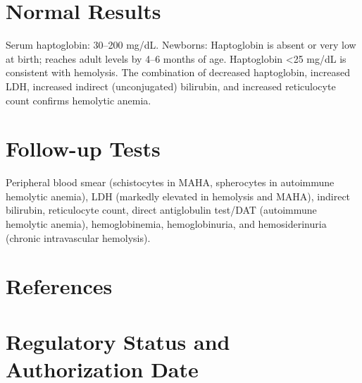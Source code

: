 \section*{Normal Results}
Serum haptoglobin: 30--200 mg/dL. Newborns: Haptoglobin is absent or very low at birth; reaches adult levels by 4--6 months of age. Haptoglobin <25 mg/dL is consistent with hemolysis. The combination of decreased haptoglobin, increased LDH, increased indirect (unconjugated) bilirubin, and increased reticulocyte count confirms hemolytic anemia.
\section*{Follow-up Tests}
Peripheral blood smear (schistocytes in MAHA, spherocytes in autoimmune hemolytic anemia), LDH (markedly elevated in hemolysis and MAHA), indirect bilirubin, reticulocyte count, direct antiglobulin test/DAT (autoimmune hemolytic anemia), hemoglobinemia, hemoglobinuria, and hemosiderinuria (chronic intravascular hemolysis).
\section*{References}


\clearpage
\section*{Regulatory Status and Authorization Date}

\clearpage
